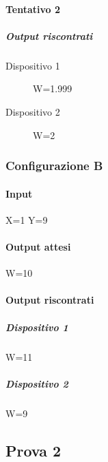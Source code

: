 \documentclass[../Sperimentazione.tex]{subfiles}
\begin{document}
			\paragraph{Tentativo 2}
			
				\subparagraph{Output riscontrati}
			
					\begin{description}
					
						\item[Dispositivo 1]
							W=1.999
				
						\item[Dispositivo 2]
							W=2
							
					\end{description}
		
		\subsubsection{Configurazione B}
			\paragraph{Input}
				X=1
				Y=9
			
			\paragraph{Output attesi}
				W=10
			
			\paragraph{Output riscontrati}
			
				\subparagraph{Dispositivo 1}
					W=11
				
				\subparagraph{Dispositivo 2}
					W=9
		
		
	\subsection{Prova 2}
	
	
\end{document}
